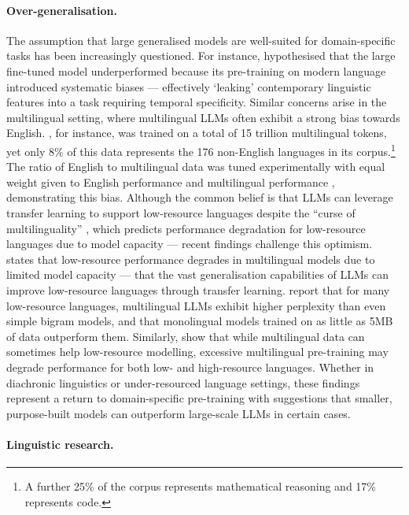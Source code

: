 \paragraph{Over-generalisation.} The assumption that large generalised models are well-suited for domain-specific tasks has been increasingly questioned. For instance, \citet{fittschen2025pretraininglanguagemodelsdiachronic} hypothesised that the large fine-tuned model underperformed because its pre-training on modern language introduced systematic biases --- effectively `leaking' contemporary linguistic features into a task requiring temporal specificity. Similar concerns arise in the multilingual setting, where multilingual LLMs often exhibit a strong bias towards English. , for instance, was trained on a total of 15 trillion multilingual tokens, yet only 8\% of this data represents the 176 non-English languages in its corpus.\footnote{A further 25\% of the corpus represents mathematical reasoning and 17\% represents code.} The ratio of English to multilingual data was tuned experimentally with equal weight given to English performance and multilingual performance \citep{grattafiori2024llama}, demonstrating this bias. Although the common belief is that LLMs can leverage transfer learning to support low-resource languages despite the ``curse of multilinguality'' \citep{conneau2020unsupervised}, which predicts performance degradation for low-resource languages due to model capacity --- recent findings challenge this optimism. states that low-resource performance degrades in multilingual models due to limited model capacity --- that the vast generalisation capabilities of LLMs can improve low-resource languages through transfer learning. \citet{chang2024goldfish} report that for many low-resource languages, multilingual LLMs exhibit higher perplexity than even simple bigram models, and that monolingual models trained on as little as 5MB of data outperform them. Similarly, \citet{chang2024multilinguality} show that while multilingual data can sometimes help low-resource modelling, excessive multilingual pre-training may degrade performance for both low- and high-resource languages. Whether in diachronic linguistics or under-resourced language settings, these findings represent a return to domain-specific pre-training with suggestions that smaller, purpose-built models can outperform large-scale LLMs in certain cases.

\paragraph{Linguistic research.} 

